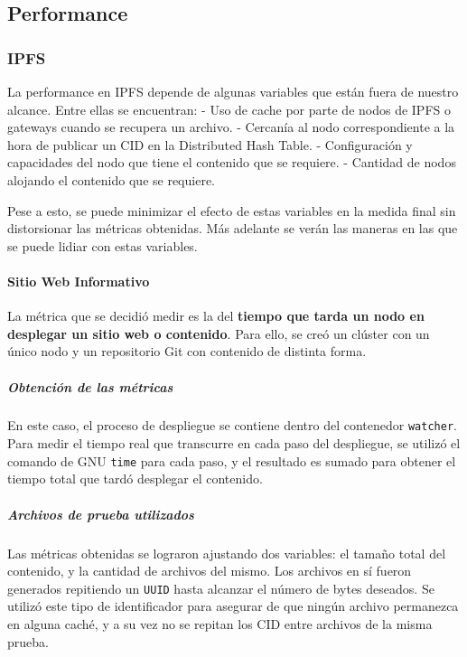 \subsection{Performance}

\subsubsection{IPFS}

La performance en IPFS depende de algunas variables que están fuera de nuestro alcance. Entre ellas se encuentran:
 - Uso de cache por parte de nodos de IPFS o gateways cuando se recupera un archivo.
 - Cercanía al nodo correspondiente a la hora de publicar un CID en la Distributed Hash Table.
 - Configuración y capacidades del nodo que tiene el contenido que se requiere.
 - Cantidad de nodos alojando el contenido que se requiere.

 Pese a esto, se puede minimizar el efecto de estas variables en la medida final sin distorsionar las métricas obtenidas. Más adelante se verán las maneras en las que se puede lidiar con estas variables.

\paragraph{Sitio Web Informativo}
La métrica que se decidió medir es la del \textbf{tiempo que tarda un nodo en desplegar un sitio web o contenido}. Para ello, se creó un clúster con un único nodo y un repositorio Git con contenido de distinta forma.

\subparagraph{Obtención de las métricas} En este caso, el proceso de despliegue se contiene dentro del contenedor \texttt{watcher}. Para medir el tiempo real que transcurre en cada paso del despliegue, se utilizó el comando de GNU \texttt{time} para cada paso, y el resultado es sumado para obtener el tiempo total que tardó desplegar el contenido.

\subparagraph{Archivos de prueba utilizados} Las métricas obtenidas se lograron ajustando dos variables: el tamaño total del contenido, y la cantidad de archivos del mismo. Los archivos en sí fueron generados repitiendo un \texttt{UUID} hasta alcanzar el número de bytes deseados. Se utilizó este tipo de identificador para asegurar de que ningún archivo permanezca en alguna caché, y a su vez no se repitan los CID entre archivos de la misma prueba.


